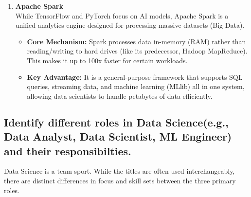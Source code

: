 \documentclass[a4paper,12pt]{article}
\begin{document}
\begin{enumerate}
    \item \textbf{Apache Spark} \\
    While TensorFlow and PyTorch focus on AI models, Apache Spark is a unified analytics engine designed for processing massive datasets (Big Data).
    \begin{itemize}
        \item \textbf{Core Mechanism:} Spark processes data in-memory (RAM) rather than reading/writing to hard drives (like its predecessor, Hadoop MapReduce). This makes it up to 100x faster for certain workloads.
        \item \textbf{Key Advantage:} It is a general-purpose framework that supports SQL queries, streaming data, and machine learning (MLlib) all in one system, allowing data scientists to handle petabytes of data efficiently.
    \end{itemize}
\end{enumerate}
\subsection{Identify different roles in Data Science(e.g., Data Analyst, Data Scientist, ML Engineer) and their responsibilties.}

Data Science is a team sport. While the titles are often used interchangeably, there are distinct differences in focus and skill sets between the three primary roles.
\end{document}
